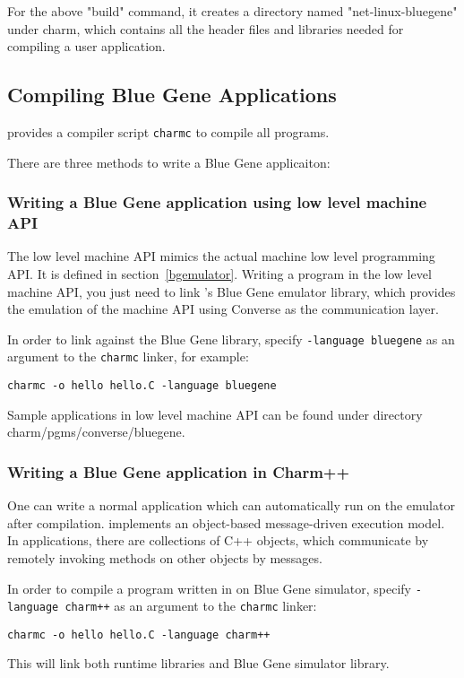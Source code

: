 For the above "build" command, it creates a directory named 
"net-linux-bluegene" under charm, which contains all the header files and
libraries needed for compiling a user application.

\subsection{Compiling Blue Gene Applications}

\charmpp{} provides a compiler script {\tt charmc} to compile all programs.

There are three methods to write a Blue Gene applicaiton:

\subsubsection{Writing a Blue Gene application using low level machine API}
The low level machine API mimics the actual machine low level programming
API. It is defined in section~\ref{bgemulator}. Writing a program in the 
low level machine API, you just need to link \charmpp{}'s Blue Gene emulator
library, which provides the emulation of the machine API using Converse as
the communication layer.

In order to link against the Blue Gene library, specify 
\texttt{-language bluegene} as an argument to the {\tt charmc} linker, 
for example:
\begin{verbatim}
charmc -o hello hello.C -language bluegene
\end{verbatim}

Sample applications in low level machine API can be found under directory
charm/pgms/converse/bluegene.

\subsubsection{Writing a Blue Gene application in Charm++}

One can write a normal \charmpp{} application which can automatically 
run on the emulator after compilation. \charmpp{} implements
an object-based message-driven execution model. In \charmpp{} applications,
there are collections of C++ objects, which communicate by remotely invoking
methods on other objects by messages.

In order to compile a program written in \charmpp{} on Blue Gene simulator, 
specify \texttt{-language charm++} as an argument to the {\tt charmc} linker:
\begin{verbatim}
charmc -o hello hello.C -language charm++
\end{verbatim}
This will link both \charmpp{} runtime libraries and Blue Gene simulator 
library.

